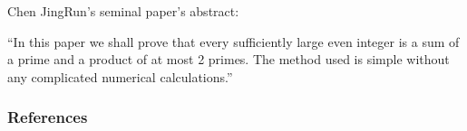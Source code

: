 \begin{frame}
Chen JingRun's seminal paper's abstract:

\centering
``In this paper we shall prove that every sufficiently large even integer is a sum of a prime and a product of at most 2 primes. The method used is simple without any complicated numerical calculations.''
\end{frame}

\begin{frame}\frametitle{References}
\printbibliography
\end{frame}
